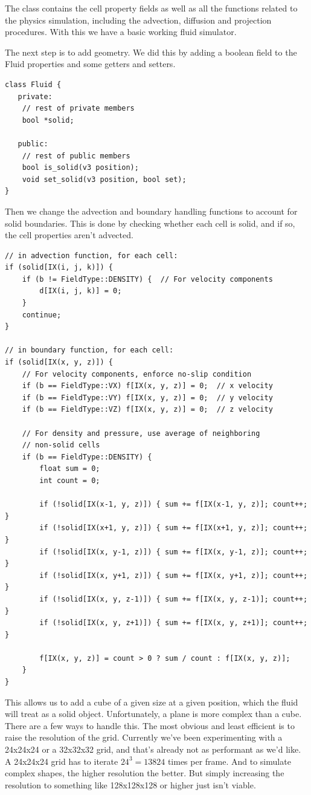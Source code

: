 \documentclass[a4paper,12pt]{article}
\begin{document}
The class contains the cell property fields as well as all the functions related
to the physics simulation, including the advection, diffusion and projection procedures.
With this we have a basic working fluid simulator.

The next step is to add geometry. We did this by adding a boolean field to the
Fluid properties and some getters and setters.
\begin{lstlisting}
class Fluid {
   private:
	// rest of private members
	bool *solid;

   public:
	// rest of public members
	bool is_solid(v3 position);
	void set_solid(v3 position, bool set);
}
\end{lstlisting}
Then we change the advection and boundary handling functions to account for
solid boundaries. This is done by checking whether each cell is solid, and if
so, the cell properties aren't advected.

\begin{lstlisting}
// in advection function, for each cell:
if (solid[IX(i, j, k)]) {
	if (b != FieldType::DENSITY) {  // For velocity components
		d[IX(i, j, k)] = 0;
	}
	continue;
}

// in boundary function, for each cell:
if (solid[IX(x, y, z)]) {
	// For velocity components, enforce no-slip condition
	if (b == FieldType::VX) f[IX(x, y, z)] = 0;  // x velocity
	if (b == FieldType::VY) f[IX(x, y, z)] = 0;  // y velocity
	if (b == FieldType::VZ) f[IX(x, y, z)] = 0;  // z velocity

	// For density and pressure, use average of neighboring
	// non-solid cells
	if (b == FieldType::DENSITY) {
		float sum = 0;
		int count = 0;

		if (!solid[IX(x-1, y, z)]) { sum += f[IX(x-1, y, z)]; count++; }
		if (!solid[IX(x+1, y, z)]) { sum += f[IX(x+1, y, z)]; count++; }
		if (!solid[IX(x, y-1, z)]) { sum += f[IX(x, y-1, z)]; count++; }
		if (!solid[IX(x, y+1, z)]) { sum += f[IX(x, y+1, z)]; count++; }
		if (!solid[IX(x, y, z-1)]) { sum += f[IX(x, y, z-1)]; count++; }
		if (!solid[IX(x, y, z+1)]) { sum += f[IX(x, y, z+1)]; count++; }

		f[IX(x, y, z)] = count > 0 ? sum / count : f[IX(x, y, z)];
	}
}
\end{lstlisting}

This allows us to add a cube of a given size at a given position, which the
fluid will treat as a solid object. Unfortunately, a plane is more complex than
a cube. There are a few ways to handle this. The most obvious and least efficient
is to raise the resolution of the grid. Currently we've been experimenting with a
24x24x24 or a 32x32x32 grid, and that's already not as performant as we'd like.
A 24x24x24 grid has to iterate $24^3 = 13824$ times per frame. And to simulate
complex shapes, the higher resolution the better. But simply increasing the
resolution to something like 128x128x128 or higher just isn't viable.
\end{document}
